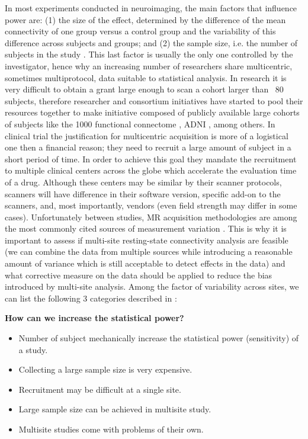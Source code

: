 \documentclass[authoryear]{elsarticle}
\begin{document}
In most experiments conducted in neuroimaging, the main factors that influence power are: (1) the size of the effect, determined by the difference of the mean connectivity of one group versus a control group and the variability of this difference across subjects and groups; and (2) the sample size, i.e. the number of subjects in the study \citep{Desmond2002}. This last factor is usually the only one controlled by the investigator, hence why an increasing number of researchers share multicentric, sometimes multiprotocol, data suitable to statistical analysis. In research it is very difficult to obtain a grant large enough to scan a cohort larger than ~80 subjects, therefore researcher and consortium initiatives have started to pool their resources together to make initiative composed of publicly available large cohorts of subjects like the 1000 functional connectome \citep{Biswal2010}, ADNI \citep{
Mueller2005}, among 
others. In clinical trial the justification for multicentric acquisition is more of a logistical one then a financial reason; they need to recruit a large amount of subject in a short period of time. In order to achieve this goal they mandate the recruitment to multiple clinical centers across the globe which accelerate the evaluation time of a drug. Although these centers may be similar by their scanner protocols, scanners will have difference in their software version, specific add-on to the scanners, and, most importantly, vendors (even field strength may differ in some cases). Unfortunately between studies, MR acquisition methodologies are among the most commonly cited sources of measurement variation \citep{Friedman2006}. This is why it is important to assess if multi-site resting-state connectivity analysis are feasible (we can combine the data from multiple sources while introducing a reasonable amount of variance which is still acceptable to detect effects in the data) and what corrective measure on 
the data should be applied to reduce the bias introduced by multi-site analysis. Among the factor of variability across sites, we can list the following 3 categories described in \citep{Yan2013a}:



\textbf{How can we increase the statistical power?}
\begin{itemize}
\item Number of subject mechanically increase the statistical power (sensitivity) of a study.
\item Collecting a large sample size is very expensive.
\item Recruitment may be difficult at a single site.
\item Large sample size can be achieved in multisite study.
\item Multisite studies come with problems of their own.
\end{itemize}
\end{document}
